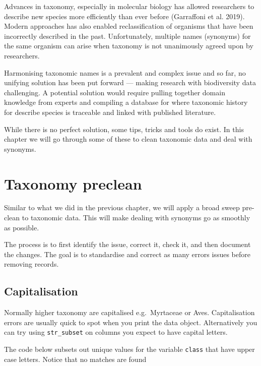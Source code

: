 \documentclass[
  letterpaper,
  DIV=11,
  numbers=noendperiod,
  oneside]{scrreprt}
\newenvironment{Shaded}{\begin{snugshade}}{\end{snugshade}}
\newcommand{\FunctionTok}[1]{\textcolor[rgb]{0.28,0.35,0.67}{#1}}
\newcommand{\NormalTok}[1]{\textcolor[rgb]{0.00,0.23,0.31}{#1}}
\newcommand{\SpecialCharTok}[1]{\textcolor[rgb]{0.37,0.37,0.37}{#1}}
\newcommand{\StringTok}[1]{\textcolor[rgb]{0.13,0.47,0.30}{#1}}
\begin{document}
Advances in taxonomy, especially in molecular biology has allowed
researchers to describe new species more efficiently than ever before
(Garraffoni et al. 2019). Modern approaches has also enabled
reclassification of organisms that have been incorrectly described in
the past. Unfortunately, multiple names (synonyms) for the same organism
can arise when taxonomy is not unanimously agreed upon by researchers.

Harmonising taxonomic names is a prevalent and complex issue and so far,
no unifying solution has been put forward --- making research with
biodiversity data challenging. A potential solution would require
pulling together domain knowledge from experts and compiling a database
for where taxonomic history for describe species is traceable and linked
with published literature.

While there is no perfect solution, some tips, tricks and tools do
exist. In this chapter we will go through some of these to clean
taxonomic data and deal with synonyms.

\hypertarget{taxonomy-preclean}{%
\section{Taxonomy preclean}\label{taxonomy-preclean}}

Similar to what we did in the previous chapter, we will apply a broad
sweep pre-clean to taxonomic data. This will make dealing with synonyms
go as smoothly as possible.

The process is to first identify the issue, correct it, check it, and
then document the changes. The goal is to standardise and correct as
many errors issues before removing records.

\hypertarget{capitalisation}{%
\subsection{Capitalisation}\label{capitalisation}}

Normally higher taxonomy are capitalised e.g.~Myrtaceae or Aves.
Capitalisation errors are usually quick to spot when you print the data
object. Alternatively you can try using \texttt{str\_subset} on columns
you expect to have capital letters.

The code below subsets out unique values for the variable \texttt{class}
that have upper case letters. Notice that no matches are found

\begin{Shaded}
\end{Shaded}
\end{document}
